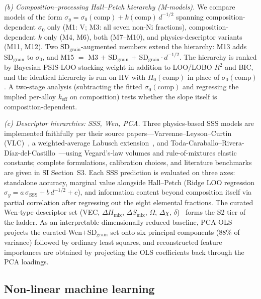 \documentclass[5p,times,twocolumn]{elsarticle}
\begin{document}
\emph{(b) Composition--processing Hall--Petch hierarchy (M-models).}
We compare models of the form $\sigma_y = \sigma_0(\text{comp}) + k(\text{comp})\,d^{-1/2}$ spanning composition-dependent $\sigma_0$ only (M1: V; M3: all seven non-Ni fractions), composition-dependent $k$ only (M4, M6), both (M7--M10), and physics-descriptor variants (M11, M12). Two $\text{SD}_\text{grain}$-augmented members extend the hierarchy: M13 adds $\text{SD}_\text{grain}$ to $\sigma_0$, and M15 $=$ M3 $+$ $\text{SD}_\text{grain}$ $+$ $\text{SD}_\text{grain}\cdot d^{-1/2}$. The hierarchy is ranked by Bayesian PSIS-LOO stacking weight in addition to LOO/LOBO $R^2$ and BIC, and the identical hierarchy is run on HV with $H_0(\text{comp})$ in place of $\sigma_0(\text{comp})$. A two-stage analysis (subtracting the fitted $\sigma_0(\text{comp})$ and regressing the implied per-alloy $k_\text{eff}$ on composition) tests whether the slope itself is composition-dependent.

\emph{(c) Descriptor hierarchies: SSS, Wen, PCA.}
Three physics-based SSS models are implemented faithfully per their source papers---Varvenne--Leyson--Curtin (VLC)~\cite{Varvenne2016,Varvenne2017}, a weighted-average Labusch extension~\cite{Labusch1970}, and Toda-Caraballo--Rivera-D\'{i}az-del-Castillo~\cite{TodaCaraballo2015}---using Vegard's-law volumes and rule-of-mixtures elastic constants; complete formulations, calibration choices, and literature benchmarks are given in SI Section~S3. Each SSS prediction is evaluated on three axes: standalone accuracy, marginal value alongside Hall--Petch (Ridge LOO regression $\sigma_y = a\,\sigma_\text{SSS} + b\,d^{-1/2} + c$), and information content beyond composition itself via partial correlation after regressing out the eight elemental fractions. The curated Wen-type descriptor set (VEC, $\Delta H_\text{mix}$, $\Delta S_\text{mix}$, $\Omega$, $\Delta\chi$, $\delta$)~\cite{Wen2021SSS,Yang2012,Guo2011} forms the S2 tier of the ladder. As an interpretable dimensionally-reduced baseline, PCA-OLS projects the curated-Wen$+$$\text{SD}_\text{grain}$ set onto six principal components (88\% of variance) followed by ordinary least squares, and reconstructed feature importances are obtained by projecting the OLS coefficients back through the PCA loadings.

\subsection{Non-linear machine learning}
\label{sec:methods_nonlinear}
\end{document}
